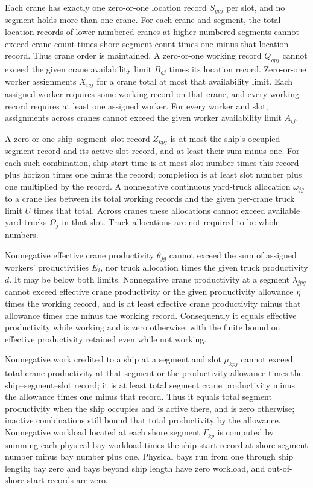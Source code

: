 \documentclass[10pt]{article}
\begin{document}
Each crane has exactly one zero-or-one location record $S_{gpj}$ per slot, and no segment holds more than one crane. For each crane and segment, the total location records of lower-numbered cranes at higher-numbered segments cannot exceed crane count times shore segment count times one minus that location record. Thus crane order is maintained. A zero-or-one working record $Q_{gpj}$ cannot exceed the given crane availability limit $B_{gj}$ times its location record. Zero-or-one worker assignments $X_{igj}$ for a crane total at most that availability limit. Each assigned worker requires some working record on that crane, and every working record requires at least one assigned worker. For every worker and slot, assignments across cranes cannot exceed the given worker availability limit $A_{ij}$.

A zero-or-one ship--segment--slot record $Z_{kpj}$ is at most the ship's occupied-segment record and its active-slot record, and at least their sum minus one. For each such combination, ship start time is at most slot number times this record plus horizon times one minus the record; completion is at least slot number plus one multiplied by the record. A nonnegative continuous yard-truck allocation $\omega_{jg}$ to a crane lies between its total working records and the given per-crane truck limit $U$ times that total. Across cranes these allocations cannot exceed available yard trucks $\Omega_j$ in that slot. Truck allocations are not required to be whole numbers.

Nonnegative effective crane productivity $\theta_{jg}$ cannot exceed the sum of assigned workers' productivities $E_i$, nor truck allocation times the given truck productivity $d$. It may be below both limits. Nonnegative crane productivity at a segment $\lambda_{jpg}$ cannot exceed effective crane productivity or the given productivity allowance $\eta$ times the working record, and is at least effective crane productivity minus that allowance times one minus the working record. Consequently it equals effective productivity while working and is zero otherwise, with the finite bound on effective productivity retained even while not working.

Nonnegative work credited to a ship at a segment and slot $\mu_{kpj}$ cannot exceed total crane productivity at that segment or the productivity allowance times the ship--segment--slot record; it is at least total segment crane productivity minus the allowance times one minus that record. Thus it equals total segment productivity when the ship occupies and is active there, and is zero otherwise; inactive combinations still bound that total productivity by the allowance. Nonnegative workload located at each shore segment $\Gamma_{kp}$ is computed by summing each physical bay workload times the ship-start record at shore segment number minus bay number plus one. Physical bays run from one through ship length; bay zero and bays beyond ship length have zero workload, and out-of-shore start records are zero.
\end{document}

